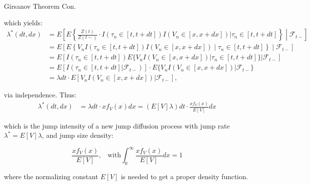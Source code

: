 \documentclass{beamer}
\begin{document}
\begin{frame}{Girsanov Theorem Con.}

    {\footnotesize \footnotesize
    \par which yields:
    \[
    \begin{aligned}
    \lambda^*(dt, dx) &= E \left[ E \left\{ \frac{Z(t)}{Z(t-)} \cdot I(\tau_n \in [t, t + dt]) I(V_n \in [x, x + dx]) | \tau_n \in [t, t + dt] \right\} \middle| \mathcal{F}_{t-} \right] \\
    &= E \left[ E \left\{ V_n I(\tau_n \in [t, t + dt]) I(V_n \in [x, x + dx]) \middle| \tau_n \in [t, t + dt] \right\} \middle| \mathcal{F}_{t-} \right] \\
    &= E \left[ I(\tau_n \in [t, t + dt]) E \{ V_n I(V_n \in [x, x + dx]) | \tau_n \in [t, t + dt] \} | \mathcal{F}_{t-} \right] \\
    &= E \left[ I(\tau_n \in [t, t + dt] | \mathcal{F}_{t-}) \right] \cdot E \{ V_n I(V_n \in [x, x + dx]) | \mathcal{F}_{t-} \} \\
    &= \lambda dt \cdot E \left[ V_n I(V_n \in [x, x + dx]) | \mathcal{F}_{t-} \right],
    \end{aligned}
    \]
    \par \pause  via independence. Thus:
    \[
    \begin{aligned}
    \lambda^*(dt, dx) &= \lambda dt \cdot x f_V(x) dx = (E [V] \lambda) dt \cdot \frac{x f_V(x)}{E [V]} dx
    \end{aligned}
    \]

which is the jump intensity of a new jump diffusion process with jump rate $\lambda^* = E [V] \lambda$, and jump size density:

\[
\frac{x f_V(x)}{E [V]}, \;\;\; \text{with} \int_{0}^{\infty} \frac{x f_V(x)}{E[V]}  dx =  1
\]

where the normalizing constant $E [V]$ is needed to get a proper density function.

    }
    
\end{frame}



    
\end{document}
